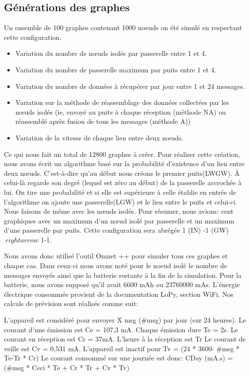 \subsection{Générations des graphes}
Un ensemble de 100 graphes contenant 1000 noeuds on été simulé en respectant cette configuration. 
\begin{itemize}
\item  Variation du nombre de nœuds isolés par passerelle entre 1 et 4.
\item  Variation du nombre de passerelle maximum par puits entre 1 et 4.
\item  Variation du nombre de données à récupérer par jour entre 1 et 24 messages.
\item  Variation sur la méthode de réassemblage des données collectées par les nœuds isolés (ie, envoyé au puits à chaque réception (méthode NA) ou réassemblé après fusion de tous les messages (méthode A))
\item  Variation de la vitesse de chaque lien entre deux nœuds.
\end{itemize}
Ce qui nous fait un total de 12800 graphes à créer. Pour réaliser cette création, nous avons écrit un algorithme basé sur la probabilité d'existence d'un lien entre deux nœuds. C'est-à-dire qu'au début nous créons le premier puits(LWGW). À celui-là regarde son degré (lequel est zéro au début) de la passerelle accrochée à lui. On tire une probabilité et si elle est supérieure à celle établie en entrée de l'algorithme on ajoute une passerelle(LGW) et le lien entre le puits et celui-ci. Nous faisons de même avec les nœuds isolés.
Pour résumer, nous avions:
cent graphiques avec un maximum d'un nœud isolé par passerelle et un maximum d'une passerelle par puits. Cette configuration sera abrégée 1 (IN) -1 (GW) $ \ rightarrow $ 1-1.

Nous avons donc utilisé l'outil Omnet ++ pour simuler tous ces graphes et chaque cas. Dans ceux-ci nous avons noté pour le noeud isolé le nombre de messages envoyés ainsi que la batterie restante à la fin de la simulation.
Pour la batterie, nous avons supposé qu'il avait 6600 mAh ou 23760000 mAs. L'énergie électrique consommée provient de la documentation LoPy, section WiFi. Nos calculs de prévision sont réalisés comme suit:

L'appareil est considéré pour envoyer X msg (\#msg) par jour (sur 24 heures). Le courant d'une émission est Ce = 107,3 ​​mA. Chaque émission dure Te = 2s.
Le courant en réception est Cr = 37mA. L'heure à la réception est Tr
Le courant de veille est Cv = 0,531 mA. L'appareil est inactif pour Tv = (24 * 3600- \#msg * Te-Tr * Cr)
Le courant consommé sur une journée est donc:
CDay (mA.s) = (\#msg * Ceci * Te + Cr * Tr + Cv * Tv)
